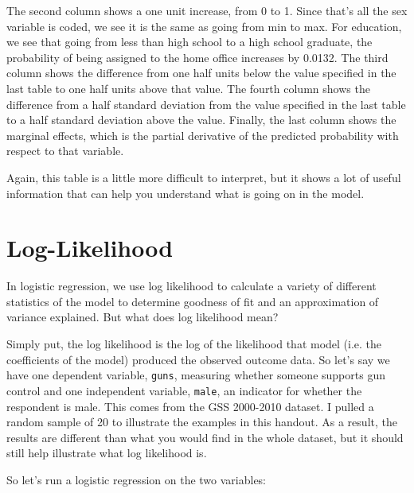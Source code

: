\documentclass[12pt]{amsart}
\begin{document}
The second column shows a one unit increase, from 0 to 1. Since that's all the sex variable is coded, we see it is the same as going from min to max. For education, we see that going from less than high school to a high school graduate, the probability of being assigned to the home office increases by 0.0132. The third column shows the difference from one half units below the value specified in the last table to one half units above that value. The fourth column shows the difference from a half standard deviation from the value specified in the last table to a half standard deviation above the value. Finally, the last column shows the marginal effects, which is the partial derivative of the predicted probability with respect to that variable. 

Again, this table is a little more difficult to interpret, but it shows a lot of useful information that can help you understand what is going on in the model. 


\section{Log-Likelihood}


In logistic regression, we use log likelihood to calculate a variety of different statistics of the model to determine goodness of fit and an approximation of variance explained. But what does log likelihood mean?

Simply put, the log likelihood is the log of the likelihood that model (i.e. the coefficients of the model) produced the observed outcome data. So let's say we have one dependent variable, \texttt{guns}, measuring whether someone supports gun control and one independent variable, \texttt{male}, an indicator for whether the respondent is male. This comes from the GSS 2000-2010 dataset. I pulled a random sample of 20 to illustrate the examples in this handout. As a result, the results are different than what you would find in the whole dataset, but it should still help illustrate what log likelihood is.

So let's run a logistic regression on the two variables:
\end{document}
